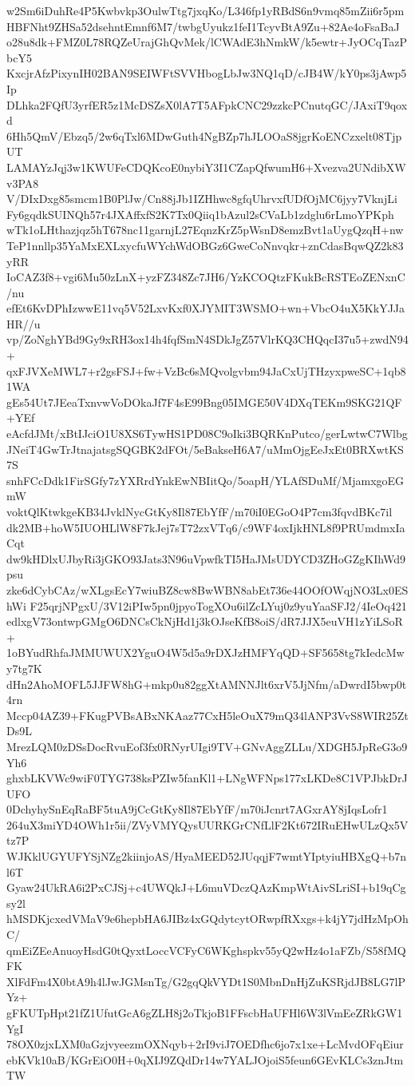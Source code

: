 w2Sm6iDuhRe4P5Kwbvkp3OulwTtg7jxqKo/L346fp1yRBdS6n9vmq85mZii6r5pm
HBFNht9ZHSa52dsehntEmnf6M7/twbgUyukz1feI1TcyvBtA9Zu+82Ae4oFsaBaJ
o28u8dk+FMZ0L78RQZeUrajGhQvMek/lCWAdE3hNmkW/k5ewtr+JyOCqTazPbcY5
KxcjrAfzPixynIH02BAN9SEIWFtSVVHbogLbJw3NQ1qD/cJB4W/kY0ps3jAwp5Ip
DLhka2FQfU3yrfER5z1McDSZsX0lA7T5AFpkCNC29zzkcPCnutqGC/JAxiT9qoxd
6Hh5QmV/Ebzq5/2w6qTxl6MDwGuth4NgBZp7hJLOOaS8jgrKoENCzxelt08TjpUT
LAMAYzJqj3w1KWUFeCDQKcoE0nybiY3I1CZapQfwumH6+Xvezva2UNdibXWv3PA8
V/DIxDxg85smcm1B0PlJw/Cn88jJb1IZHhwc8gfqUhrvxfUDfOjMC6jyy7VknjLi
Fy6gqdkSUINQh57r4JXAffxfS2K7Tx0Qiiq1bAzul2sCVaLb1zdglu6rLmoYPKph
wTk1oLHthazjqz5hT678nc11garnjL27EqnzKrZ5pWsnD8emzBvt1aUygQzqH+nw
TeP1nnllp35YaMxEXLxycfuWYchWdOBGz6GweCoNnvqkr+znCdasBqwQZ2k83yRR
IoCAZ3f8+vgi6Mu50zLnX+yzFZ348Zc7JH6/YzKCOQtzFKukBcRSTEoZENxnC/nu
efEt6KvDPhIzwwE11vq5V52LxvKxf0XJYMIT3WSMO+wn+VbcO4uX5KkYJJaHR//u
vp/ZoNghYBd9Gy9xRH3ox14h4fqfSmN4SDkJgZ57VlrKQ3CHQqcI37u5+zwdN94+
qxFJVXeMWL7+r2gsFSJ+fw+VzBc6sMQvolgvbm94JaCxUjTHzyxpweSC+1qb81WA
gEs54Ut7JEeaTxnvwVoDOkaJf7F4sE99Bng05IMGE50V4DXqTEKm9SKG21QF+YEf
eAcfdJMt/xBtIJciO1U8XS6TywHS1PD08C9oIki3BQRKnPutco/gerLwtwC7Wlbg
JNeiT4GwTrJtnajatsgSQGBK2dFOt/5eBakseH6A7/uMmOjgEeJxEt0BRXwtKS7S
snhFCcDdk1FirSGfy7zYXRrdYnkEwNBIitQo/5oapH/YLAfSDuMf/MjamxgoEGmW
voktQlKtwkgeKB34JvklNycGtKy8Il87EbYfF/m70iI0EGoO4P7cm3fqvdBKc7il
dk2MB+hoW5IUOHLlW8F7kJej7sT72zxVTq6/c9WF4oxIjkHNL8f9PRUmdmxIaCqt
dw9kHDlxUJbyRi3jGKO93Jats3N96uVpwfkTI5HaJMsUDYCD3ZHoGZgKIhWd9psu
zke6dCybCAz/wXLgsEcY7wiuBZ8cw8BwWBN8abEt736e44OOfOWqjNO3Lx0EShWi
F25qrjNPgxU/3V12iPIw5pn0jpyoTogXOu6ilZcLYuj0z9yuYaaSFJ2/4IeOq421
edlxgV73ontwpGMgO6DNCsCkNjHd1j3kOJseKfB8oiS/dR7JJX5euVH1zYiLSoR+
1oBYudRhfaJMMUWUX2YguO4W5d5a9rDXJzHMFYqQD+SF5658tg7kIedcMwy7tg7K
dHn2AhoMOFL5JJFW8hG+mkp0u82ggXtAMNNJlt6xrV5JjNfm/aDwrdI5bwp0t4rn
Mccp04AZ39+FKugPVBsABxNKAaz77CxH5leOuX79mQ34lANP3VvS8WIR25ZtDs9L
MrezLQM0zDSsDocRvuEof3fx0RNyrUIgi9TV+GNvAggZLLu/XDGH5JpReG3o9Yh6
ghxbLKVWc9wiF0TYG738ksPZIw5fanKl1+LNgWFNps177xLKDe8C1VPJbkDrJUFO
0DchyhySnEqRaBF5tuA9jCcGtKy8Il87EbYfF/m70iJcnrt7AGxrAY8jIqsLofr1
264uX3miYD4OWh1r5ii/ZVyVMYQysUURKGrCNfLlF2Kt672IRuEHwULzQx5Vtz7P
WJKklUGYUFYSjNZg2kiinjoAS/HyaMEED52JUqqjF7wmtYIptyiuHBXgQ+b7nl6T
Gyaw24UkRA6i2PxCJSj+c4UWQkJ+L6muVDczQAzKmpWtAivSLriSI+b19qCgsy2l
hMSDKjcxedVMaV9e6hepbHA6JIBz4xGQdytcytORwpfRXxgs+k4jY7jdHzMpOhC/
qmEiZEeAnuoyHsdG0tQyxtLoccVCFyC6WKghspkv55yQ2wHz4o1aFZb/S58fMQFK
XlFdFm4X0btA9h4lJwJGMsnTg/G2gqQkVYDt1S0MbnDnHjZuKSRjdJB8LG7lPYz+
gFKUTpHpt21fZ1UfutGcA6gZLH8j2oTkjoB1FFscbHaUFHl6W3lVmEeZRkGW1YgI
78OX0zjxLXM0aGzjvyeezmOXNqyb+2rI9viJ7OEDfhc6jo7x1xe+LcMvdOFqEiur
ebKVk10aB/KGrEiO0H+0qXIJ9ZQdDr14w7YALJOjoiS5feun6GEvKLCs3znJtmTW

